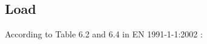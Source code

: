 \subsection{Load}
According to Table 6.2 and 6.4 in EN 1991-1-1:2002 \cite{EN1991-1-1-2002(3)}:
\begin{longtable}{|l|l|c|c|}

\end{longtable}
